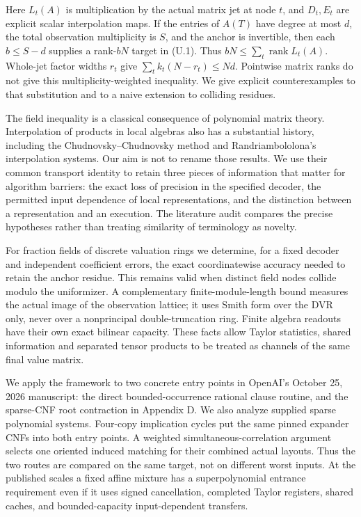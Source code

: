\documentclass[
  11pt,
]{article}
\begin{document}
Here \(L_t(A)\) is multiplication by the actual matrix jet at node
\(t\), and \(D_t,E_t\) are explicit scalar interpolation maps. If the
entries of \(A(T)\) have degree at most \(d\), the total observation
multiplicity is \(S\), and the anchor is invertible, then each
\(b\le S-d\) supplies a rank-\(bN\) target in (U.1). Thus
\(bN\le\sum_t\operatorname{rank}L_t(A)\). Whole-jet factor widths
\(r_t\) give \(\sum_t k_t(N-r_t)\le Nd\). Pointwise matrix ranks do not
give this multiplicity-weighted inequality. We give explicit
counterexamples to that substitution and to a naive extension to
colliding residues.

The field inequality is a classical consequence of polynomial matrix
theory. Interpolation of products in local algebras also has a
substantial history, including the Chudnovsky--Chudnovsky method and
Randriambololona's interpolation systems. Our aim is not to rename those
results. We use their common transport identity to retain three pieces
of information that matter for algorithm barriers: the exact loss of
precision in the specified decoder, the permitted input dependence of
local representations, and the distinction between a representation and
an execution. The literature audit compares the precise hypotheses
rather than treating similarity of terminology as novelty.

For fraction fields of discrete valuation rings we determine, for a
fixed decoder and independent coefficient errors, the exact
coordinatewise accuracy needed to retain the anchor residue. This
remains valid when distinct field nodes collide modulo the uniformizer.
A complementary finite-module-length bound measures the actual image of
the observation lattice; it uses Smith form over the DVR only, never
over a nonprincipal double-truncation ring. Finite algebra readouts have
their own exact bilinear capacity. These facts allow Taylor statistics,
shared information and separated tensor products to be treated as
channels of the same final value matrix.

We apply the framework to two concrete entry points in OpenAI's October
25, 2026 manuscript: the direct bounded-occurrence rational clause
routine, and the sparse-CNF root contraction in Appendix D. We also
analyze supplied sparse polynomial systems. Four-copy implication cycles
put the same pinned expander CNFs into both entry points. A weighted
simultaneous-correlation argument selects one oriented induced matching
for their combined actual layouts. Thus the two routes are compared on
the same target, not on different worst inputs. At the published scales
a fixed affine mixture has a superpolynomial entrance requirement even
if it uses signed cancellation, completed Taylor registers, shared
caches, and bounded-capacity input-dependent transfers.
\end{document}
